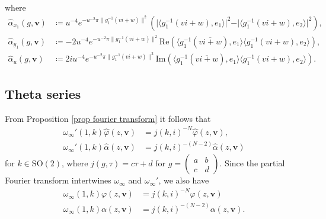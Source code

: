 \documentclass[twoside,a4paper,10pt]{article} %
\newcommand{\alphahat}{\widehat{\alpha}}
\newcommand{\8}{\infty}
\newcommand{\vbf}{\mathbf{v}}
\newcommand{\SO}{\mathrm{SO}}
\newcommand{\re}{\mathrm{Re}}
\newcommand{\im}{\mathrm{Im}}
\theoremstyle{mytheoremstyle}
\theoremstyle{remark}
\numberwithin{equation}{section}
\begin{document}
where
\begin{align} \label{formulaalphaxyu}
\alphahat_{x_1}(g,\vbf) &\coloneqq u^{-4}e^{-u^{-2}\pi \lVert g_1^{-1}(vi+w) \rVert^2} \left ( \vert \langle g_1^{-1}(vi+w),e_1\rangle \vert^2-\vert \langle g_1^{-1}(vi+w),e_2\rangle\vert^2 \right ), \nonumber \\
\alphahat_{y_1}(g,\vbf)&\coloneqq-2u^{-4}e^{-u^{-2}\pi \lVert g_1^{-1}(vi+w) \rVert^2} \re \left ( \langle g_1^{-1}(\overline{vi+w}),e_1\rangle \langle g_1^{-1}(vi+w),e_2\rangle\right ), \\
\alphahat_{u}(g,\vbf)&\coloneqq 2iu^{-4}e^{-u^{-2}\pi \lVert g_1^{-1}(vi+w) \rVert^2} \im \left ( \langle g_1^{-1}(\overline{vi+w}),e_1\rangle \langle g_1^{-1}(vi+w),e_2\rangle\right ).
\end{align}











\subsection{Theta series}  From Proposition \ref{prop fourier transform} it follows that
\begin{align} 
\omega_\8'(1,k)\widehat{\varphi}(z,\vbf) & =j(k,i)^{-N}\widehat{\varphi}(z,\vbf), \\
\omega_\8'(1,k)\alphahat(z,\vbf)&=j(k,i)^{-(N-2)}\alphahat(z,\vbf)
\end{align}
for $k \in \SO(2)$, where $j(g,\tau)=c\tau+d$ for $g=\begin{pmatrix} a & b \\ c & d \end{pmatrix}$. Since the partial Fourier transform intertwines $\omega_\8$ and $\omega_\8'$, we also have
\begin{align} \label{indep}
\omega_\8(1,k)\varphi(z,\vbf)&=j(k,i)^{-N}\varphi(z,\vbf) \\
\omega_\8(1,k)\alpha(z,\vbf)&=j(k,i)^{-(N-2)}\alpha(z,\vbf).
\end{align}
\end{document}

